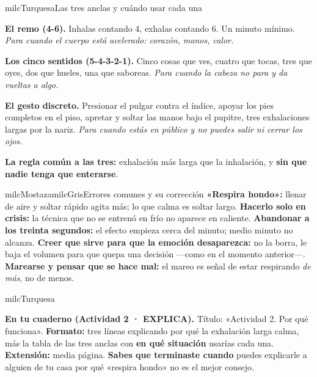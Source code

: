 \documentclass[11pt,letterpaper]{article}
\begin{document}
\begin{drawbox}{milcTurquesa}{Las tres anclas y cuándo usar cada una}
\begin{pasoslista}
\item \textbf{El remo (4-6).} Inhalas contando 4, exhalas contando 6. Un minuto mínimo. \emph{Para cuando el cuerpo está acelerado: corazón, manos, calor.}
\item \textbf{Los cinco sentidos (5-4-3-2-1).} Cinco cosas que ves, cuatro que tocas, tres que oyes, dos que hueles, una que saboreas. \emph{Para cuando la cabeza no para y da vueltas a algo.}
\item \textbf{El gesto discreto.} Presionar el pulgar contra el índice, apoyar los pies completos en el piso, apretar y soltar las manos bajo el pupitre, tres exhalaciones largas por la nariz. \emph{Para cuando estás en público y no puedes salir ni cerrar los ojos.}
\item \textbf{La regla común a las tres:} exhalación más larga que la inhalación, y \textbf{sin que nadie tenga que enterarse}.
\end{pasoslista}
\end{drawbox}

\begin{softbox}{milcMostaza}{milcGris}{Errores comunes y su corrección}
\textbf{«Respira hondo»:} llenar de aire y soltar rápido agita más; lo que calma es soltar largo. \textbf{Hacerlo solo en crisis:} la técnica que no se entrenó en frío no aparece en caliente. \textbf{Abandonar a los treinta segundos:} el efecto empieza cerca del minuto; medio minuto no alcanza. \textbf{Creer que sirve para que la emoción desaparezca:} no la borra, le baja el volumen para que quepa una decisión ---como en el momento anterior---. \textbf{Marearse y pensar que se hace mal:} el mareo es señal de estar respirando \emph{de más}, no de menos.
\end{softbox}

\begin{infoband}{milcTurquesa}


\textbf{En tu cuaderno (Actividad 2 · EXPLICA).} Título: «Actividad 2. Por qué funciona». \textbf{Formato:} tres líneas explicando por qué la exhalación larga calma, más la tabla de las tres anclas con \textbf{en qué situación} usarías cada una. \textbf{Extensión:} media página. \textbf{Sabes que terminaste cuando} puedes explicarle a alguien de tu casa por qué «respira hondo» no es el mejor consejo.
\end{infoband}
\end{document}
